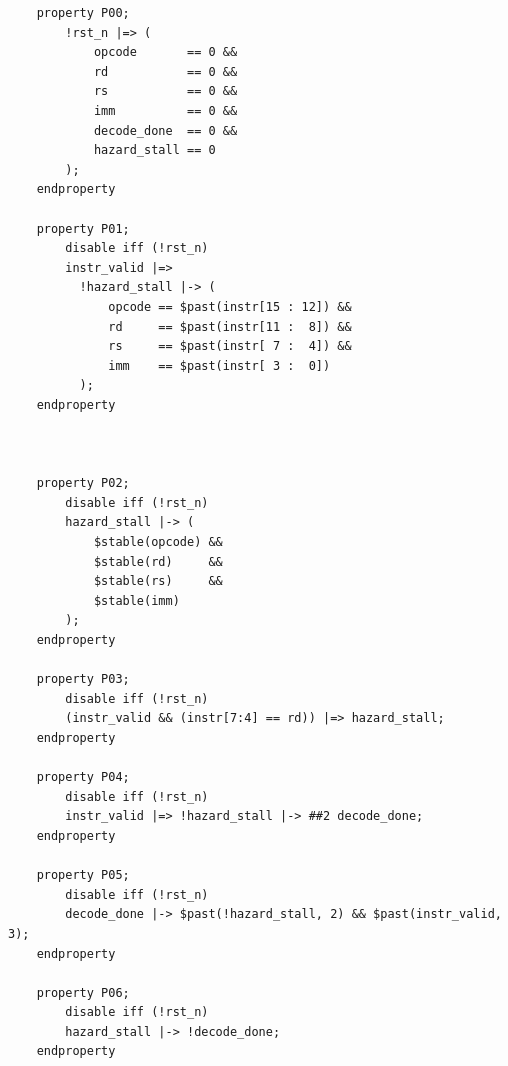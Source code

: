\begin{verbatim}
	property P00;
        !rst_n |=> (
            opcode       == 0 && 
            rd           == 0 && 
            rs           == 0 && 
            imm          == 0 && 
            decode_done  == 0 && 
            hazard_stall == 0
        );
    endproperty

    property P01;
        disable iff (!rst_n)
        instr_valid |=> 
          !hazard_stall |-> (
              opcode == $past(instr[15 : 12]) && 
              rd     == $past(instr[11 :  8]) && 
              rs     == $past(instr[ 7 :  4]) && 
              imm    == $past(instr[ 3 :  0])
          );
    endproperty


	
    property P02;
        disable iff (!rst_n)
        hazard_stall |-> (
            $stable(opcode) && 
            $stable(rd)     && 
            $stable(rs)     && 
            $stable(imm)
        );
    endproperty
    
    property P03;
        disable iff (!rst_n)
        (instr_valid && (instr[7:4] == rd)) |=> hazard_stall;
    endproperty

    property P04;
        disable iff (!rst_n)
        instr_valid |=> !hazard_stall |-> ##2 decode_done;
    endproperty

    property P05;
        disable iff (!rst_n)
        decode_done |-> $past(!hazard_stall, 2) && $past(instr_valid, 3);
    endproperty

    property P06;
        disable iff (!rst_n)
        hazard_stall |-> !decode_done;
    endproperty
\end{verbatim}